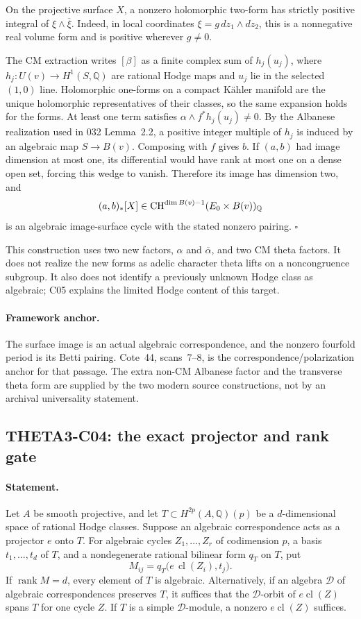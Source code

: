 \documentclass[11pt]{article}
\newcommand{\Q}{\mathbb Q}\newcommand{\C}{\mathbb C}\newcommand{\Z}{\mathbb Z}\newcommand{\R}{\mathbb R}\newcommand{\A}{\mathbb A}\newcommand{\OO}{\mathcal O}
\theoremstyle{definition}\newtheorem{definition}[theorem]{Definition}\newtheorem{remark}[theorem]{Remark}
\begin{document}
On the projective surface $X$, a nonzero holomorphic two-form has
strictly positive integral of $\xi\wedge\overline\xi$. Indeed, in
local coordinates $\xi=g\,dz_1\wedge dz_2$, this is a nonnegative
real volume form and is positive wherever $g\ne0$.

The CM extraction writes $[\beta]$ as a finite complex sum of
$h_j(u_j)$, where $h_j:U(v)\to H^1(S,\Q)$ are rational Hodge maps
and $u_j$ lie in the selected $(1,0)$ line. Holomorphic one-forms on
a compact K\"ahler manifold are the unique holomorphic
representatives of their classes, so the same expansion holds for
the forms. At least one term satisfies
$\alpha\wedge f^*h_j(u_j)\ne0$. By the Albanese realization used
in 032 Lemma~2.2, a positive integer multiple of $h_j$ is induced
by an algebraic map $S\to B(v)$. Composing with $f$ gives $b$.
If $(a,b)$ had image dimension at most one, its differential would
have rank at most one on a dense open set, forcing this wedge to
vanish. Therefore its image has dimension two, and
\[
 (a,b)_*[X]\in
 \CH^{\dim B(v)-1}(E_0\times B(v))_{\Q}
\]
is an algebraic image-surface cycle with the stated nonzero pairing.
$\square$

This construction uses two new factors, $\alpha$ and
$\overline\alpha$, and two CM theta factors. It does not realize
the new forms as adelic character theta lifts on a noncongruence
subgroup. It also does not identify a previously unknown Hodge class
as algebraic; C05 explains the limited Hodge content of this target.

\paragraph{Framework anchor.}
The surface image is an actual algebraic correspondence, and the nonzero
fourfold period is its Betti pairing.  Cote~44, scans~7--8, is the
correspondence/polarization anchor for that passage.  The extra non-CM
Albanese factor and the transverse theta form are supplied by the two
modern source constructions, not by an archival universality statement.

\subsection{THETA3-C04: the exact projector and rank gate}\label{C04}

\paragraph{Statement.}
Let $A$ be smooth projective, and let
$T\subset H^{2p}(A,\Q)(p)$ be a $d$-dimensional space of rational
Hodge classes. Suppose an algebraic correspondence acts as a
projector $e$ onto $T$. For algebraic cycles $Z_1,\ldots,Z_r$ of
codimension $p$, a basis $t_1,\ldots,t_d$ of $T$, and a
nondegenerate rational bilinear form $q_T$ on $T$, put
\[
 M_{ij}=q_T\bigl(e\,\operatorname{cl}(Z_i),t_j\bigr).
\]
If $\operatorname{rank}M=d$, every element of $T$ is algebraic.
Alternatively, if an algebra $\mathcal D$ of algebraic
correspondences preserves $T$, it suffices that the
$\mathcal D$-orbit of $e\operatorname{cl}(Z)$ spans $T$ for one
cycle $Z$. If $T$ is a simple $\mathcal D$-module, a nonzero
$e\operatorname{cl}(Z)$ suffices.
\end{document}

